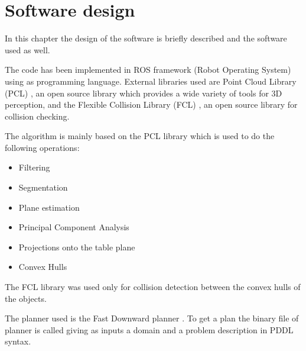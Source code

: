 \chapter{Software design}
\label{ch:software_design}
In this chapter the design of the software is briefly described and the  software used as well. 

The code has been implemented in ROS framework (Robot Operating System) \citep{ROS} using  as programming language. 
External libraries used are Point Cloud Library (PCL) \citep{PCL}, an open source library which provides a wide variety of tools for 3D perception, and the Flexible Collision Library (FCL) \citep{pan2012fcl}, an open source  library for collision checking.

The algorithm is mainly based on the PCL library which is used to do the following operations:
\begin{itemize}
\item Filtering
\item Segmentation
\item Plane estimation
\item Principal Component Analysis
\item Projections onto the table plane
\item Convex Hulls
\end{itemize}
The FCL library was used only for collision detection between the convex hulls of the objects. 

The planner used is the Fast Downward planner \citep{helmert2006fast}. To get a plan the binary file of planner is called giving as inputs a domain and a problem description in PDDL syntax.

 
\iffalse
For the collision checking the Flexible Collision Library (FCL) \citep{pan2012fcl} has been used. This library allows to define the collision problem in a simpler manner than other more famous collision libraries such as \textit{Bullet} \citep{Bullet}, and it can work with different objects shapes such as box, spheres, cone, convex, mesh and octree. 
The main library used in this work is the Point Cloud Library (PCL) \citep{PCL_}, which allows some methods to create an object shape from a point cloud.

\begin{enumerate}
\item Nodes
\item Ros graph 
\item simulation
\item PCL - FCL 
\end{enumerate}
\fi

